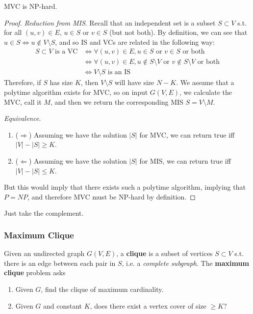     \begin{theorem}[MVC]
      MVC is NP-hard. 
    \end{theorem}
    \begin{proof}
      \textit{Reduction from MIS}. Recall that an independent set is a subset $S \subset V$ s.t. for all $(u, v) \in E$, $u \in S$ or $v \in S$ (but not both). By definition, we can see that $u \in S \iff u \not\in V \setminus S$, and so IS and VCs are related in the following way: 
      \begin{align}
        S \subset V \text{ is a VC} & \iff \forall (u, v) \in E, u \in S \text{ or } v \in S \text{ or both} \\
                                    & \iff \forall (u, v) \in E, u \not\in S \setminus V \text{ or } v \not\in S \setminus V \text{ or both} \\
                                    & \iff V \setminus S \text{ is an IS}
      \end{align}
      Therefore, if $S$ has size $K$, then $V \setminus S$ will have size $N - K$. We assume that a polytime algorithm exists for MVC, so on input $G(V, E)$, we calculate the MVC, call it $M$, and then we return the corresponding MIS $S = V \setminus M$. 

      \textit{Equivalence}. 
      \begin{enumerate}
        \item ($\Rightarrow$) Assuming we have the solution $|S|$ for MVC, we can return true iff $|V| - |S| \geq K$. 
        \item ($\Leftarrow$) Assuming we have the solution $|S|$ for MIS, we can return true iff $|V| - |S| \leq K$. 
      \end{enumerate}
      But this would imply that there exists such a polytime algorithm, implying that $P = NP$, and therefore MVC must be NP-hard by definition. 
    \end{proof}

    \begin{example}
      Just take the complement. 
    \end{example}

  \subsubsection{Maximum Clique}

    \begin{definition}
      Given an undirected graph $G(V, E)$, a \textbf{clique} is a subset of vertices $S \subset V$ s.t. there is an edge between each pair in $S$, i.e. a \textit{complete subgraph}. The \textbf{maximum clique} problem asks 
      \begin{enumerate}
        \item Given $G$, find the clique of maximum cardinality. 
        \item Given $G$ and constant $K$, does there exist a vertex cover of size $\geq K$? 
      \end{enumerate}
    \end{definition} 

